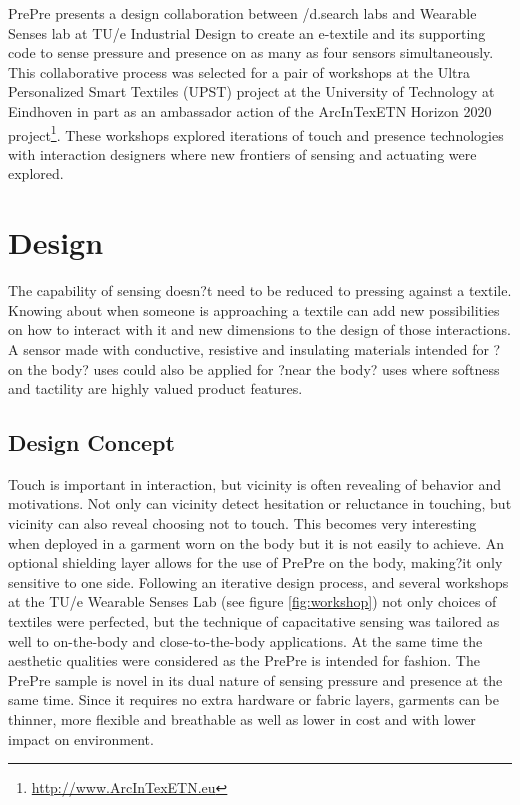 \documentclass{sigchi-ext}
\begin{document}
PrePre presents a design collaboration between /d.search labs and Wearable Senses lab at TU/e Industrial Design to create an e-textile and its supporting code to sense pressure and presence on as many as four sensors simultaneously. This collaborative process was selected for a pair of workshops at the Ultra Personalized Smart Textiles (UPST) project at the University of Technology at Eindhoven in part as an ambassador action of the ArcInTexETN Horizon 2020 project\footnote{\url{http://www.ArcInTexETN.eu}}. These workshops explored iterations of touch and presence technologies with interaction designers where new frontiers of sensing and actuating were explored.  

\section{Design}
The capability of sensing doesn?t need to be reduced to pressing against a textile. Knowing about when someone is approaching a textile can add new possibilities on how to interact with it and new dimensions to the design of those interactions. A sensor made with conductive, resistive and insulating materials  intended for ?on the body? uses could also be applied for ?near the body? uses where softness and tactility are highly valued product features.
\subsection{Design Concept}
Touch is important in interaction, but vicinity is often revealing of behavior and motivations. Not only can vicinity detect hesitation or reluctance in touching, but vicinity can also reveal choosing not to touch. This becomes very interesting when deployed in a garment worn on the body but it is not easily to achieve. An optional shielding layer allows for the use of PrePre on the body, making?it only sensitive to one side. Following an iterative design process, and several workshops at the TU/e Wearable Senses Lab (see figure  \ref{fig:workshop}) not only choices of textiles were perfected, but the technique of capacitative sensing was tailored as well to on-the-body and close-to-the-body applications. At the same time the aesthetic qualities were considered as the PrePre is intended for fashion. The PrePre sample is novel in its dual nature of sensing pressure and presence at the same time. Since it requires no extra hardware or fabric layers, garments can be thinner, more flexible and breathable as well as lower in cost and with lower impact on environment. 
\end{document}
